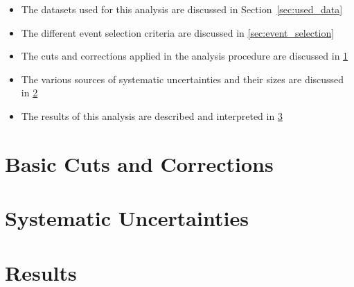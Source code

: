 \begin{itemize}
\item The datasets used for this analysis are discussed in Section~\ref{sec:used_data}
\item The different event selection criteria are discussed in \ref{sec:event_selection}
\item The cuts and corrections applied in the analysis procedure are discussed in  \ref{sec:cuts_corrections}
\item The various sources of systematic uncertainties and their sizes are discussed in \ref{sec:systematic}
\item The results of this analysis are described and interpreted in \ref{sec:results}
\end{itemize}


%
%
%
%
%

%

\section{Basic Cuts and Corrections}
\label{sec:cuts_corrections}


\section{Systematic Uncertainties}
\label{sec:systematic}


\section{Results}
\label{sec:results}


%
